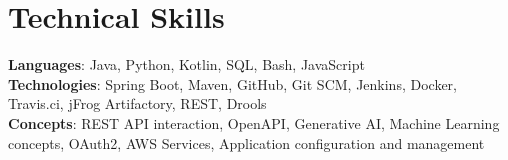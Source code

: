 \section{Technical Skills}
    \begin{itemize}[leftmargin=0.15in, label={}]
	\small{\item{
		\textbf{Languages}{: Java, Python, Kotlin, SQL, Bash, JavaScript} \\
		\textbf{Technologies}{: Spring Boot, Maven, GitHub, Git SCM, Jenkins, Docker, Travis.ci, jFrog Artifactory, REST, Drools} \\
		\textbf{Concepts}{: REST API interaction, OpenAPI, Generative AI, Machine Learning concepts, OAuth2, AWS Services, Application configuration and management}
	}}
    \end{itemize}